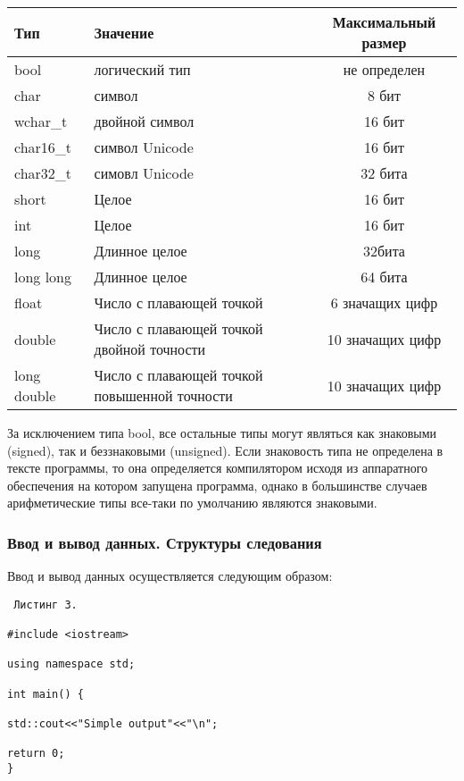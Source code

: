 \documentclass[a4paper,report,14pt]{ncc}
\begin{document}
\begin{center}
\begin{tabular}{|l|p{7cm}|c|}\hline
Тип & Значение & Максимальный размер\\\hline
bool & логический тип & не определен\\\hline
char & символ & 8 бит\\\hline
wchar\_t & двойной символ & 16 бит\\\hline
char16\_t & символ Unicode & 16 бит\\\hline
char32\_t & симовл Unicode & 32 бита\\\hline
short & Целое & 16 бит\\\hline
int & Целое & 16 бит\\\hline
long & Длинное целое & 32бита\\\hline
long long & Длинное целое & 64 бита\\\hline
float & Число с плавающей точкой & 6 значащих цифр\\\hline
double & Число с плавающей точкой двойной точности & 10 значащих цифр\\\hline
long double & Число с плавающей точкой повышенной точности & 10 значащих цифр\\\hline
\end{tabular}
\end{center}

За исключением типа bool, все остальные типы могут являться как знаковыми (signed), так и беззнаковыми (unsigned). Если знаковость типа не определена в тексте программы, то она определяется компилятором исходя из аппаратного обеспечения на котором запущена программа, однако в большинстве случаев арифметические типы все-таки по умолчанию являются знаковыми.

\subsubsection{Ввод и вывод данных. Структуры следования}

Ввод и вывод данных осуществляется следующим образом:

\begin{verbatim}
 Листинг 3.
 
#include <iostream>

using namespace std;

int main() {

std::cout<<"Simple output"<<"\n";

return 0;
}
\end{verbatim}
\end{document}
